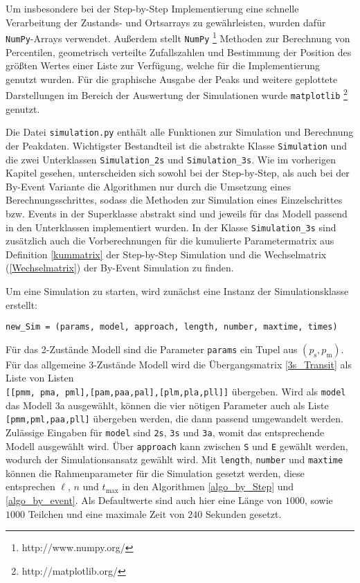 Um insbesondere bei der Step-by-Step Implementierung eine schnelle Verarbeitung der Zustands- und Ortsarrays zu gewährleisten, wurden dafür \texttt{NumPy}-Arrays verwendet. Außerdem stellt \texttt{NumPy} \footnote{http://www.numpy.org/} Methoden zur Berechnung von Percentilen, geometrisch verteilte Zufallszahlen und Bestimmung der Position des größten Wertes einer Liste zur Verfügung, welche für die Implementierung genutzt wurden.
Für die graphische Ausgabe der Peaks und weitere geplottete Darstellungen im Bereich der Auswertung der Simulationen wurde \texttt{matplotlib} \footnote{http://matplotlib.org/} genutzt.


Die Datei \texttt{simulation.py} enthält alle Funktionen zur Simulation und Berechnung der Peakdaten. Wichtigster Bestandteil ist die abstrakte Klasse \texttt{Simulation} und die zwei Unterklassen \texttt{Simulation\_2s} und \texttt{Simulation\_3s}. Wie im vorherigen Kapitel gesehen, unterscheiden sich sowohl bei der Step-by-Step, als auch bei der By-Event Variante die Algorithmen nur durch die Umsetzung eines Berechnungsschrittes, sodass die Methoden zur Simulation eines Einzelschrittes bzw. Events in der Superklasse abstrakt sind und jeweils für das Modell passend in den Unterklassen implementiert wurden. In der Klasse \verb!Simulation_3s! sind zusätzlich auch die Vorberechnungen für die kumulierte Parametermatrix aus Definition \ref{kummatrix} der Step-by-Step Simulation und die Wechselmatrix (\ref{Wechselmatrix}) der By-Event Simulation zu finden.

Um eine Simulation zu starten, wird zunächst eine Instanz der Simulationsklasse erstellt:
\begin{verbatim}
new_Sim = (params, model, approach, length, number, maxtime, times)
\end{verbatim}                                                                                                  
Für das 2-Zustände Modell sind die Parameter \verb!params! ein Tupel aus $(p_\text{s}, p_\text{m})$. Für das allgemeine 3-Zustände Modell wird die Übergangsmatrix \ref{3s_Transit} als Liste von Listen \\ \verb![[pmm, pma, pml],[pam,paa,pal],[plm,pla,pll]]! übergeben. Wird als \verb!model! das Modell 3a ausgewählt, können die vier nötigen Parameter auch als Liste \verb![pmm,pml,paa,pll]! übergeben werden, die dann passend umgewandelt werden.
Zulässige Eingaben für \verb!model! sind \texttt{2s}, \texttt{3s} und \texttt{3a}, womit das entsprechende Modell ausgewählt wird. Über \verb!approach! kann zwischen \texttt{S} und \texttt{E} gewählt werden, wodurch der Simulationsansatz gewählt wird.
Mit \verb!length!, \verb!number! und \verb!maxtime! können die Rahmenparameter für die Simulation gesetzt werden, diese entsprechen $\ell$, $n$ und $t_{\text{max}}$ in den Algorithmen \ref{algo_by_Step} und \ref{algo_by_event}. Als Defaultwerte sind auch hier eine Länge von $1000$, sowie $1000$ Teilchen und eine maximale Zeit von $240$ Sekunden gesetzt.


